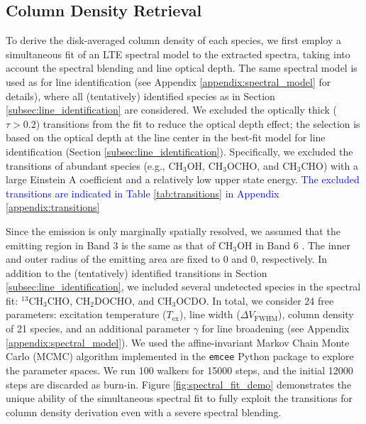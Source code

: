 \documentclass[twocolumn, twocolappendix, astrosymb, times]{aastex631}
\newcommand{\methanol}{CH$_3$OH\xspace}
\newcommand{\acetaldehyde}{CH$_3$CHO\xspace}
\newcommand{\methylformate}{CH$_3$OCHO\xspace}
\begin{document}
\subsection{Column Density Retrieval}\label{subsec:spectral_fit}
To derive the disk-averaged column density of each species, we first employ a simultaneous fit of an LTE spectral model to the extracted spectra, taking into account the spectral blending and line optical depth. The same spectral model is used as for line identification (see Appendix \ref{appendix:spectral_model} for details), where all (tentatively) identified species as in Section \ref{subsec:line_identification} are considered. We excluded the optically thick ($\tau > 0.2$) transitions from the fit to reduce the optical depth effect; the selection is based on the optical depth at the line center in the best-fit model for line identification (Section \ref{subsec:line_identification}). Specifically, we excluded the transitions of abundant species (e.g., \methanol, \methylformate, and \acetaldehyde) with a large Einstein A coefficient and a relatively low upper state energy. \textcolor{blue}{The excluded transitions are indicated in Table \ref{tab:transitions} in Appendix \ref{appendix:transitions}}


Since the emission is only marginally spatially resolved, we assumed that the emitting region in Band 3 is the same as that of \methanol in Band 6 \citep{Tobin2023}. The inner and outer radius of the emitting area are fixed to 0 and 0, respectively. 
In addition to the (tentatively) identified transitions in Section \ref{subsec:line_identification}, we included several undetected species in the spectral fit: $^{13}$CH$_3$CHO, CH$_2$DOCHO, and CH$_3$OCDO. In total, we consider 24 free parameters: excitation temperature ($T_\mathrm{ex}$), line width ($\Delta V_\mathrm{FWHM}$), column density of 21 species, and an additional parameter $\gamma$ for line broadening (see Appendix \ref{appendix:spectral_model}). 
We used the affine-invariant Markov Chain Monte Carlo (MCMC) algorithm implemented in the \texttt{emcee} Python package \citep{emcee} to explore the parameter spaces. We run 100 walkers for 15000 steps, and the initial 12000 steps are discarded as burn-in. Figure \ref{fig:spectral_fit_demo} demonstrates the unique ability of the simultaneous spectral fit to fully exploit the transitions for column density derivation even with a severe spectral blending. 
\end{document}
